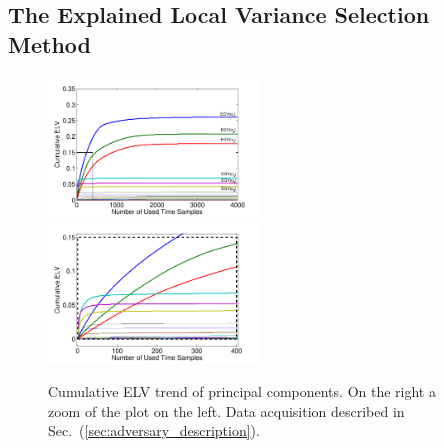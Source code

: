 %
\subsection{The Explained Local Variance Selection Method} 

\begin{figure}
\includegraphics[width=0.5\textwidth]{figures/cumulativeELVallRectangle.pdf} 
\includegraphics[width=0.5\textwidth]{figures/cumulativeELVzoomedRectangle.pdf} 
\caption{Cumulative ELV trend of principal components. On the right a zoom of the plot on the left. Data acquisition described in Sec.~(\ref{sec:adversary_description}).}\label{fig:ELVcumulative}
\end{figure}


